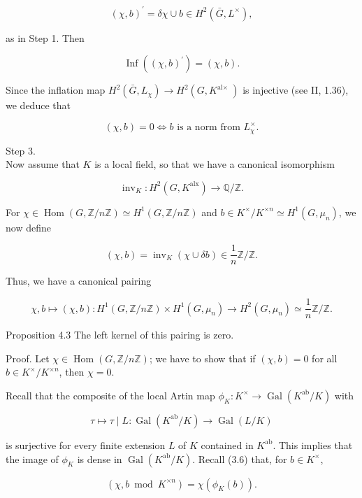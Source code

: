\documentclass[10pt]{article}
\begin{document}
$$
(\chi, b)^{\prime}=\delta \chi \cup b \in H^{2}\left(\bar{G}, L^{\times}\right),
$$

as in Step 1. Then

$$
\operatorname{Inf}\left((\chi, b)^{\prime}\right)=(\chi, b) .
$$

Since the inflation map $H^{2}\left(\bar{G}, L_{\chi}\right) \rightarrow H^{2}\left(G, K^{\text {al× }}\right)$ is injective (see II, 1.36), we deduce that

$$
(\chi, b)=0 \Longleftrightarrow b \text { is a norm from } L_{\chi}^{\times} .
$$

Step 3.\\
Now assume that $K$ is a local field, so that we have a canonical isomorphism

$$
\operatorname{inv}_{K}: H^{2}\left(G, K^{\mathrm{alx}}\right) \rightarrow \mathbb{Q} / \mathbb{Z} .
$$

For $\chi \in \operatorname{Hom}(G, \mathbb{Z} / n \mathbb{Z}) \simeq H^{1}(G, \mathbb{Z} / n \mathbb{Z})$ and $b \in K^{\times} / K^{\times n} \simeq H^{1}\left(G, \mu_{n}\right)$, we now define

$$
(\chi, b)=\operatorname{inv}_{K}(\chi \cup \delta b) \in \frac{1}{n} \mathbb{Z} / \mathbb{Z} .
$$

Thus, we have a canonical pairing

$$
\chi, b \mapsto(\chi, b): H^{1}(G, \mathbb{Z} / n \mathbb{Z}) \times H^{1}\left(G, \mu_{n}\right) \rightarrow H^{2}\left(G, \mu_{n}\right) \simeq \frac{1}{n} \mathbb{Z} / \mathbb{Z} .
$$

Proposition 4.3 The left kernel of this pairing is zero.

Proof. Let $\chi \in \operatorname{Hom}(G, \mathbb{Z} / n \mathbb{Z})$; we have to show that if $(\chi, b)=0$ for all $b \in K^{\times} / K^{\times n}$, then $\chi=0$.

Recall that the composite of the local Artin map $\phi_{K}: K^{\times} \rightarrow \operatorname{Gal}\left(K^{\mathrm{ab}} / K\right)$ with

$$
\tau \mapsto \tau \mid L: \operatorname{Gal}\left(K^{\mathrm{ab}} / K\right) \rightarrow \operatorname{Gal}(L / K)
$$

is surjective for every finite extension $L$ of $K$ contained in $K^{\mathrm{ab}}$. This implies that the image of $\phi_{K}$ is dense in $\operatorname{Gal}\left(K^{\mathrm{ab}} / K\right)$. Recall (3.6) that, for $b \in K^{\times}$,

$$
\left(\chi, b \bmod K^{\times n}\right)=\chi\left(\phi_{K}(b)\right) .
$$
\end{document}
